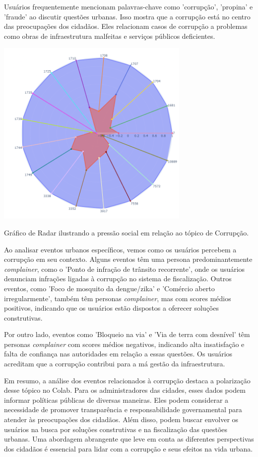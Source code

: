 Usuários frequentemente mencionam palavras-chave como 'corrupção', 'propina' e 'fraude' ao discutir questões urbanas. Isso mostra que a corrupção está no centro das preocupações dos cidadãos. Eles relacionam casos de corrupção a problemas como obras de infraestrutura malfeitas e serviços públicos deficientes.

\begin{quadro}[htb]
	\centering
	\includegraphics[width=0.7\textwidth]{images/social_barometer_corruption.png}
	\caption{Gráfico de Radar ilustrando a pressão social em relação ao tópico de Corrupção.}
	\label{fig:social_barometer_corruption}
\end{quadro}

Ao analisar eventos urbanos específicos, vemos como os usuários percebem a corrupção em seu contexto. Alguns eventos têm uma persona predominantemente \textit{complainer}, como o 'Ponto de infração de trânsito recorrente', onde os usuários denunciam infrações ligadas à corrupção no sistema de fiscalização. Outros eventos, como 'Foco de mosquito da dengue/zika' e 'Comércio aberto irregularmente', também têm personas \textit{complainer}, mas com scores médios positivos, indicando que os usuários estão dispostos a oferecer soluções construtivas.

Por outro lado, eventos como 'Bloqueio na via' e 'Via de terra com desnível' têm personas \textit{complainer} com scores médios negativos, indicando alta insatisfação e falta de confiança nas autoridades em relação a essas questões. Os usuários acreditam que a corrupção contribui para a má gestão da infraestrutura.

Em resumo, a análise dos eventos relacionados à corrupção destaca a polarização desse tópico no Colab. Para os administradores das cidades, esses dados podem informar políticas públicas de diversas maneiras. Eles podem considerar a necessidade de promover transparência e responsabilidade governamental para atender às preocupações dos cidadãos. Além disso, podem buscar envolver os usuários na busca por soluções construtivas e na fiscalização das questões urbanas. Uma abordagem abrangente que leve em conta as diferentes perspectivas dos cidadãos é essencial para lidar com a corrupção e seus efeitos na vida urbana.

